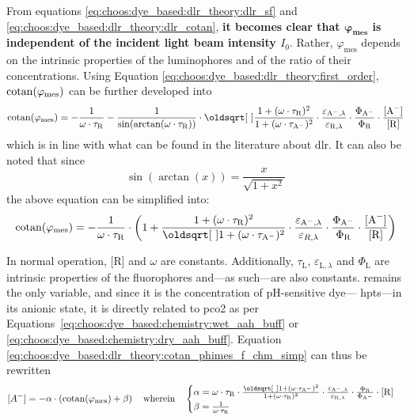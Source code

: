From equations \ref{eq:choos:dye_based:dlr_theory:dlr_sf} and \ref{eq:choos:dye_based:dlr_theory:dlr_cotan}, \textbf{it becomes clear that $\mathbf{\varphi_\text{mes}}$ is independent of the incident light beam intensity $I_0$}. Rather, $\varphi_\text{mes}$ depends on the intrinsic properties of the luminophores and of the ratio of their concentrations. Using Equation \ref{eq:choos:dye_based:dlr_theory:first_order}, $\operatorname{cotan}(\varphi_\text{mes})$ can be further developed into
\begin{equation}\label{eq:choos:dye_based:dlr_theory:cotan_phimes_f_chm}
	\cotan(\varphi_\text{mes}) = -\frac{1}{\omega \cdot \tau_\mathrm{R}} - \frac{1}{\sin(\arctan(\omega \cdot \tau_\mathrm{R}))} \cdot \sqrt{\frac{1 + (\omega \cdot \tau_\mathrm{R})^2}{1 + (\omega \cdot \tau_\mathrm{A\spminus})^2}}\cdot \frac{\varepsilon_{\mathrm{A\spminus}, \lambda}}{\varepsilon_{\mathrm{R}, \lambda}} \cdot \frac{\Phi_\mathrm{A\spminus}}{\Phi_\mathrm{R}} \cdot \frac{\ce{[A^-]}}{\ce{[R]}}
\end{equation}
which is in line with what can be found in the literature about \gls{dlr}\cite{neurauter2000_phd, cajlakovic2006}. It can also be noted that since
\begin{equation}
	\sin(\arctan(x)) = \frac{x}{\sqrt{1+x^2}}
\end{equation}
the above equation can be simplified into:
\begin{equation}\label{eq:choos:dye_based:dlr_theory:cotan_phimes_f_chm_simp}
	\cotan(\varphi_\text{mes}) = -\frac{1}{\omega \cdot \tau_\mathrm{R}} \cdot \left(1 + \frac{1 + (\omega \cdot \tau_\mathrm{R})^2}{\sqrt{1 + (\omega \cdot \tau_\mathrm{A\spminus})^2}}\cdot \frac{\varepsilon_{\mathrm{A\spminus}, \lambda}}{\varepsilon_{R, \lambda}}\cdot \frac{\Phi_{\mathrm{A\spminus}}}{\Phi_\mathrm{R}}\cdot \frac{\ce{[A^-]}}{\ce{[R]}} \right)
\end{equation}

In normal operation, [R] and $\omega$ are constants. Additionally, $\tau_\mathrm{L}$, $\varepsilon_{\mathrm{L},\lambda}$ and $\Phi_\mathrm{L}$ are intrinsic properties of the fluorophores and---as such---are also constants. \ce{[A^-]} remains the only variable, and since it is the concentration of pH-sensitive dye---\eg{} \gls{hpts}---in its anionic state, it is directly related to \gls{pco2} as per Equations~\ref{eq:choos:dye_based:chemistry:wet_aah_buff} or \ref{eq:choos:dye_based:chemistry:dry_aah_buff}. Equation \ref{eq:choos:dye_based:dlr_theory:cotan_phimes_f_chm_simp} can thus be rewritten
\begin{equation}\label{eq:choos:dye_based:dlr_theory:rm_f_phi}
	[A^-] = - \alpha \cdot \left( \cotan(\varphi_\text{mes}) + \beta \right) \quad \text{wherein} \quad \begin{cases}
		\alpha = \omega \cdot \tau_\mathrm{R} \cdot \frac{\sqrt{1 + (\omega \cdot \tau_\mathrm{A\spminus})^2}}{1 + (\omega \cdot \tau_\mathrm{R})^2} \cdot \frac{\varepsilon_{\mathrm{A\spminus}, \lambda}}{\varepsilon_{\mathrm{R}, \lambda}} \cdot \frac{\Phi_\mathrm{R}}{\Phi_\mathrm{A\spminus}} \cdot \ce{[R]} \\
		\beta = \frac{1}{\omega \cdot \tau_\mathrm{R}}
	\end{cases}
\end{equation}

